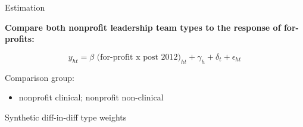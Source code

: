 \documentclass[notes,11pt, aspectratio=169]{beamer}
\begin{document}
\begin{frame}{Estimation}

    \textbf{Compare both nonprofit leadership team types to the response of for-profits:}

    \vspace{3mm}\large
    \begin{equation*}
    y_{ht} = \beta \text{ (for-profit x post 2012)}_{ht} + \gamma_{h} + \delta_t + \epsilon_{ht}
    \end{equation*}

    \vspace{5mm}
    \normalsize

    Comparison group:
    \begin{itemize}
        \item nonprofit clinical; nonprofit non-clinical
    \end{itemize}

    \vspace{5mm}

    Synthetic diff-in-diff type weights

\end{frame}
\end{document}
